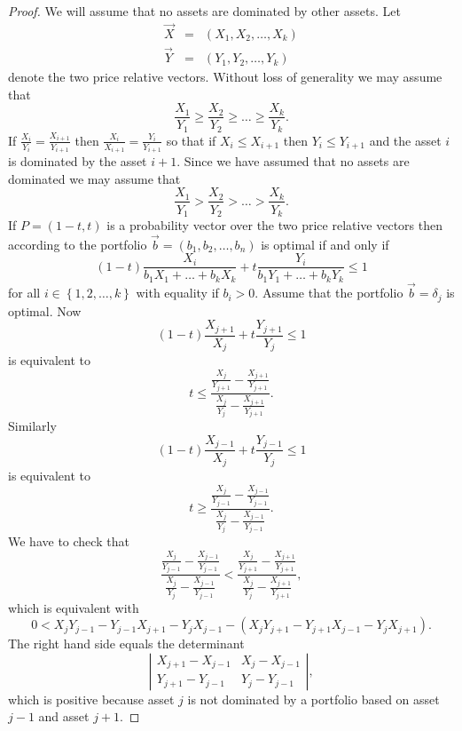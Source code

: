 \documentclass[10pt,a4paper,draft]{article}
\begin{document}
\begin{proof}
We will assume that no assets are dominated by other assets. Let
\begin{eqnarray*}
\vec{X} & = & \left(X_{1},X_{2},\dots,X_{k}\right)\\
\vec{Y} & = & \left(Y_{1},Y_{2},\dots,Y_{k}\right)
\end{eqnarray*}
denote the two price relative vectors. Without loss of
generality we may assume that 
\[
\frac{X_{1}}{Y_{1}}\geq\frac{X_{2}}{Y_{2}}\geq\dots\geq\frac{X_{k}}{Y_{k}}.
\]
If $\frac{X_{i}}{Y_{i}}=\frac{X_{i+1}}{Y_{i+1}}$ then
$\frac{X_{i}}{X_{i+1}}=\frac{Y_{i}}{Y_{i+1}}$
so that if $X_{i}\leq X_{i+1}$ then $Y_{i}\leq Y_{i+1}$ and the
asset $i$ is dominated by the asset $i+1.$ Since we have assumed that no assets are dominated we may assume that 
\[
\frac{X_{1}}{Y_{1}}>\frac{X_{2}}{Y_{2}}>\dots>\frac{X_{k}}{Y_{k}}.
\]
If $P=\left(1-t,t\right)$ is a probability vector over the two price relative vectors then according to \cite{Cover1991} the
portfolio $\vec{b}=\left(b_{1},b_{2},\dots,b_{n}\right)$ is optimal if and only if 
\[
(1-t)\frac{X_{i}}{b_{1}X_{1}+\dots+b_{k}X_{k}}+t\frac{Y_{i}}{b_{1}Y_{1}+\dots+b_{k}Y_{k}}\leq1
\]
for all $i\in\left\{ 1,2,\dots,k\right\} $ with equality if
$b_{i}>0.$
Assume that the portfolio $\vec{b}=\delta_{j}$ is optimal.
Now
\[
\left(1-t\right)\frac{X_{j+1}}{X_{j}}+t\frac{Y_{j+1}}{Y_{j}} \leq1
\]
is equivalent to
\begin{equation}\label{eq:hoejreendepunkt}
t \leq\frac{\frac{X_{j}}{Y_{j+1}}-\frac{X_{j+1}}{Y_{j+1}}}{\frac{X_{j}}{Y_{j}}-\frac{X_{j+1}}{Y_{j+1}}}.
\end{equation}
Similarly
\[
\left(1-t\right)\frac{X_{j-1}}{X_{j}}+t\frac{Y_{j-1}}{Y_{j}} \leq1
\]
is equivalent to 
\begin{equation}\label{eq:venstreendepunkt}
t \geq\frac{\frac{X_{j}}{Y_{j-1}}-\frac{X_{j-1}}{Y_{j-1}}}{\frac{X_{j}}{Y_{j}}-\frac{X_{j-1}}{Y_{j-1}}}.
\end{equation}
We have to check that 
\[
\frac{\frac{X_{j}}{Y_{j-1}}-\frac{X_{j-1}}{Y_{j-1}}}{\frac{X_{j}}{Y_{j}}-\frac{X_{j-1}}{Y_{j-1}}}<\frac{\frac{X_{j}}{Y_{j+1}}-\frac{X_{j+1}}{Y_{j+1}}}{\frac{X_{j}}{Y_{j}}-\frac{X_{j+1}}{Y_{j+1}}},
\]
which is equivalent with
\[
0 <X_{j}Y_{j-1}-Y_{j-1}X_{j+1}-Y_{j}X_{j-1}-\left(X_{j}Y_{j+1}-Y_{j+1}X_{j-1}-Y_{j}X_{j+1}\right).
\]
The right hand side equals the determinant
\[
\left|\begin{array}{cc}
X_{j+1}-X_{j-1} & X_{j}-X_{j-1}\\
Y_{j+1}-Y_{j-1} & Y_{j}-Y_{j-1}
\end{array}\right|,
\]
which is positive because asset $j$ is not dominated by a
portfolio
based on asset $j-1$ and asset $j+1.$ 


\end{proof}
\end{document}
